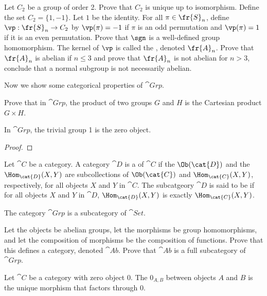 \documentclass[10pt]{article}
\begin{document}
\begin{problem}
    Let ${C}_{2}$ be a group of order 2. Prove that ${C}_{2}$ is unique up to isomorphism. Define the set ${C}_{2}=\{1,-1\}$. Let $1$ be the identity. For all $\pi\in{\fr{S}}_{n}$, define $\vp:{\fr{S}}_{n}\to{C}_{2}$ by $\vp(\pi)=-1$ if $\pi$ is an odd permutation and $\vp(\pi)=1$ if it is an even permutation. Prove that $\sgn$ is a well-defined group homomorphism. The kernel of $\vp$ is called the , denoted ${\fr{A}}_{n}$. Prove that ${\fr{A}}_{n}$ is abelian if $n\le 3$ and prove that ${\fr{A}}_{n}$ is not abelian for $n>3$, conclude that a normal subgroup is not necessarily abelian.
\end{problem}
\par
Now we show some categorical properties of $\cat{Grp}$.
\begin{problem}
    Prove that in $\cat{Grp}$, the product of two groups $G$ and $H$ is the Cartesian product $G\times H$.
\end{problem}
\begin{proposition}
    In $\cat{Grp}$, the trivial group 1 is the zero object.
\end{proposition}
\begin{proof}
    
\end{proof}
\begin{definition}
    Let $\cat{C}$ be a category. A category $\cat{D}$ is a  of $\cat{C}$ if the $\Ob(\cat{D})$ and the ${\Hom}_{\cat{D}}(X,Y)$ are subcollections of $\Ob(\cat{C})$ and ${\Hom}_{\cat{C}}(X,Y)$, respectively, for all objects $X$ and $Y$ in $\cat{C}$. The subcatgeory $\cat{D}$ is said to be  if for all objects $X$ and $Y$ in $\cat{D}$, ${\Hom}_{\cat{D}}(X,Y)$ is exactly ${\Hom}_{\cat{C}}(X,Y)$.
\end{definition}
\begin{example}
    The category $\cat{Grp}$ is a subcategory of $\cat{Set}$.
\end{example}
\begin{problem}
    Let the objects be abelian groups, let the morphisms be group homomorphisms, and let the composition of morphisms be the composition of functions. Prove that this defines a category, denoted $\cat{Ab}$. Prove that $\cat{Ab}$ is a full subcategory of $\cat{Grp}$.
\end{problem}
\begin{definition}
    Let $\cat{C}$ be a category with zero object 0. The  ${0}_{A,B}$ between objects $A$ and $B$ is the unique morphism that factors through 0.
\end{definition}
\end{document}
